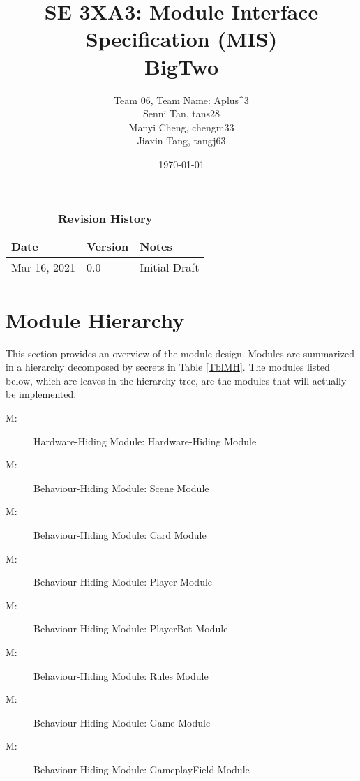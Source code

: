 \documentclass[12pt, titlepage]{article}
\title{SE 3XA3: Module Interface Specification (MIS)\\BigTwo}
\author{Team 06, Team Name: Aplus^3
		\\ Senni Tan, tans28
		\\ Manyi Cheng, chengm33
		\\ Jiaxin Tang, tangj63
}
\date{\today}
\newcounter{mnum}
\newcommand{\mthemnum}{M\themnum}
\begin{document}
\maketitle
{}
\tableofcontents
\listoftables



\begin{table}[bp]
\caption{\bf Revision History}
\begin{tabularx}{\textwidth}{p{3cm}p{2cm}X}
\toprule {\bf Date} & {\bf Version} & {\bf Notes}\\
\midrule
Mar 16, 2021 & 0.0 & Initial Draft \\
\bottomrule
\end{tabularx}
\end{table}
\FloatBarrier

\newpage
{}

\section{Module Hierarchy} \label{SecMH}

This section provides an overview of the module design. Modules are summarized
in a hierarchy decomposed by secrets in Table \ref{TblMH}. The modules listed
below, which are leaves in the hierarchy tree, are the modules that will
actually be implemented.

\begin{description}
\item [ \mthemnum \label{mHH}:] Hardware-Hiding Module: Hardware-Hiding Module
\item [ \mthemnum \label{mHH}:] Behaviour-Hiding Module: Scene Module
\item [ \mthemnum \label{mHH}:] Behaviour-Hiding Module:  Card Module
\item [ \mthemnum \label{mHH}:]
Behaviour-Hiding Module:  Player Module
\item [ \mthemnum \label{mHH}:] Behaviour-Hiding Module:  PlayerBot Module
\item [ \mthemnum \label{mHH}:] Behaviour-Hiding Module:  Rules Module
\item [ \mthemnum \label{mHH}:] Behaviour-Hiding Module: Game Module
\item [ \mthemnum \label{mHH}:] Behaviour-Hiding Module:  GameplayField Module

\end{description}
\end{document}
